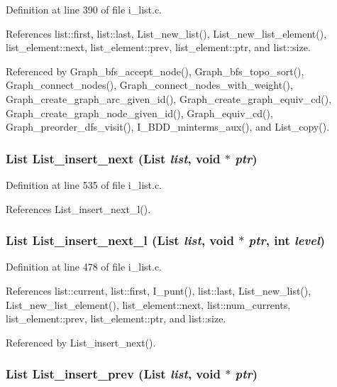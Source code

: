 Definition at line 390 of file i\_\-list.c.

References list::first, list::last, List\_\-new\_\-list(), List\_\-new\_\-list\_\-element(), list\_\-element::next, list\_\-element::prev, list\_\-element::ptr, and list::size.

Referenced by Graph\_\-bfs\_\-accept\_\-node(), Graph\_\-bfs\_\-topo\_\-sort(), Graph\_\-connect\_\-nodes(), Graph\_\-connect\_\-nodes\_\-with\_\-weight(), Graph\_\-create\_\-graph\_\-arc\_\-given\_\-id(), Graph\_\-create\_\-graph\_\-equiv\_\-cd(), Graph\_\-create\_\-graph\_\-node\_\-given\_\-id(), Graph\_\-equiv\_\-cd(), Graph\_\-preorder\_\-dfs\_\-visit(), I\_\-BDD\_\-minterms\_\-aux(), and List\_\-copy().
\subsubsection{\setlength{\rightskip}{0pt plus 5cm}\bf{List} List\_\-insert\_\-next (\bf{List} {\em list}, void $\ast$ {\em ptr})}\label{i__list_8c_07de90b64e7e042feb063db108e75103}




Definition at line 535 of file i\_\-list.c.

References List\_\-insert\_\-next\_\-l().
\subsubsection{\setlength{\rightskip}{0pt plus 5cm}\bf{List} List\_\-insert\_\-next\_\-l (\bf{List} {\em list}, void $\ast$ {\em ptr}, int {\em level})}\label{i__list_8c_ca60b026c6cd5d0f17f3154d7fc1d7c7}




Definition at line 478 of file i\_\-list.c.

References list::current, list::first, I\_\-punt(), list::last, List\_\-new\_\-list(), List\_\-new\_\-list\_\-element(), list\_\-element::next, list::num\_\-currents, list\_\-element::prev, list\_\-element::ptr, and list::size.

Referenced by List\_\-insert\_\-next().
\subsubsection{\setlength{\rightskip}{0pt plus 5cm}\bf{List} List\_\-insert\_\-prev (\bf{List} {\em list}, void $\ast$ {\em ptr})}\label{i__list_8c_be307e7f9cba458db32c616840300275}




